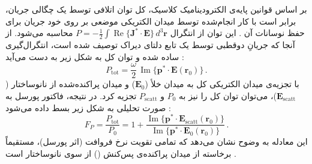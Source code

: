 \documentclass[12pt,a4paper]{report}
\newcommand{\sub}[1]{\mathrm{#1}}               %
\newcommand{\Imag}{\operatorname{Im}}
\newcommand{\Real}{\operatorname{Re}}
\begin{document}
بر اساس قوانین پایه‌ی الکترودینامیک کلاسیک، کل توان اتلافی توسط یک چگالی جریان، برابر است با کار انجام‌شده توسط میدان الکتریکی موضعی بر روی خود جریان برای حفظ نوسانات آن \cite{novotny}. این توان از انتگرال $P=-\tfrac{1}{2}\int\Real\{\mathbf{J}^*\cdot\mathbf{E}\}\,d^3\mathbf{r}$ محاسبه می‌شود. از آنجا که جریانِ دوقطبی توسط یک تابع دلتای دیراک توصیف شده است، انتگرال‌گیری ساده شده و توان کل به شکل زیر به دست می‌آید \cite{novotny}:
\begin{equation}
P_{\sub{tot}}=\frac{\omega}{2}\,\Imag\{\mathbf{p}^*\cdot\mathbf{E}(\mathbf{r}_0)\}\,.
\end{equation}
با تجزیه‌ی میدان الکتریکی کل به میدان خلأ ($\mathbf{E}_0$) و میدان پراکنده‌شده از نانوساختار ($\mathbf{E}_{\sub{scatt}}$)، می‌توان توان کل را نیز به $P_0$ و $P_{\sub{scatt}}$ تجزیه کرد. در نتیجه، فاکتور پورسل به صورت تحلیلی به شکل زیر بسط داده می‌شود \cite{novotny}:
\begin{equation}
F_P=\frac{P_{\sub{tot}}}{P_0}=1+\frac{\Imag\{\mathbf{p}^*\cdot\mathbf{E}_{\sub{scatt}}(\mathbf{r}_0)\}}{\Imag\{\mathbf{p}^*\cdot\mathbf{E}_0(\mathbf{r}_0)\}}\,.
\end{equation}
این معادله به وضوح نشان می‌دهد که تمامی تقویت نرخ فروافت (اثر پورسل)، مستقیماً برخاسته از میدان پراکنده‌ی پس‌کنش () از سوی نانوساختار است \cite{novotny}.
\end{document}
